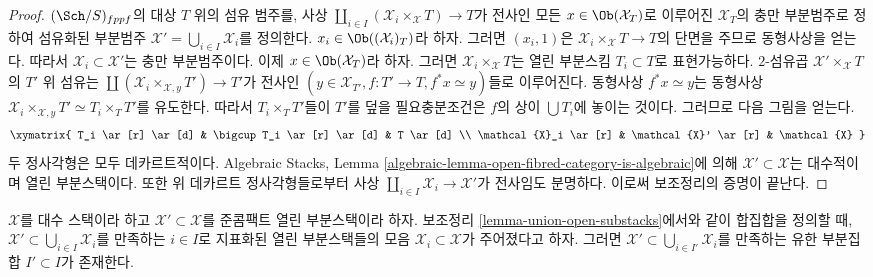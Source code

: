 \begin{proof}
$(\Sch/S)_{fppf}$의 대상 $T$ 위의 섬유 범주를, 사상
$\coprod_{i \in I} (\mathcal{X}_i \times_{\mathcal X} T) \to T$가
전사인 모든 $x \in \Ob(\mathcal{X}_T)$로 이루어진
$\mathcal{X}_T$의 충만 부분범주로 정하여 섬유화된 부분범주
$\mathcal{X}' = \bigcup_{i \in I} \mathcal{X}_i$를 정의한다.
$x_i \in \Ob((\mathcal{X}_i)_T)$라 하자. 그러면 $(x_i, 1)$은
$\mathcal{X}_i \times_{\mathcal X} T \to T$의 단면을 주므로
동형사상을 얻는다. 따라서 $\mathcal{X}_i \subset \mathcal{X}'$는 충만 부분범주이다.
이제 $x \in \Ob(\mathcal{X}_T)$라 하자. 그러면
$\mathcal{X}_i \times_{\mathcal X} T$는 열린 부분스킴 $T_i \subset T$로
표현가능하다. $2$-섬유곱 $\mathcal{X}' \times_{\mathcal X} T$의
$T'$ 위 섬유는
$\coprod (\mathcal{X}_i \times_{\mathcal X, y} T') \to T'$가 전사인
$(y \in \mathcal{X}_{T'}, f : T' \to T, f^*x \simeq y)$들로 이루어진다.
동형사상 $f^*x \simeq y$는 동형사상
$\mathcal{X}_i \times_{\mathcal X, y} T' \simeq T_i \times_T T'$를 유도한다.
따라서 $T_i \times_T T'$들이 $T'$를 덮을 필요충분조건은 $f$의 상이
$\bigcup T_i$에 놓이는 것이다. 그러므로 다음 그림을 얻는다.
$$
\xymatrix{
T_i \ar[r] \ar[d] &
\bigcup T_i \ar[r] \ar[d] &
T \ar[d] \\
\mathcal{X}_i \ar[r] &
\mathcal{X}' \ar[r] &
\mathcal{X}
}
$$
두 정사각형은 모두 데카르트적이다. Algebraic Stacks,
Lemma \ref{algebraic-lemma-open-fibred-category-is-algebraic}에 의해
$\mathcal{X'} \subset \mathcal{X}$는 대수적이며 열린 부분스택이다.
또한 위 데카르트 정사각형들로부터 사상
$\coprod_{i \in I} \mathcal{X}_i \to \mathcal{X}'$가 전사임도 분명하다.
이로써 보조정리의 증명이 끝난다.
\end{proof}

\begin{lemma}
\label{lemma-quasi-compact-finite-subcover}
$\mathcal X$를 대수 스택이라 하고 $\mathcal X' \subset \mathcal X$를
준콤팩트 열린 부분스택이라 하자. 보조정리 \ref{lemma-union-open-substacks}에서와
같이 합집합을 정의할 때,
$\mathcal{X}' \subset \bigcup_{i \in I} \mathcal{X}_i$를 만족하는
$i \in I$로 지표화된 열린 부분스택들의 모음
$\mathcal{X}_i \subset \mathcal X$가 주어졌다고 하자.
그러면 $\mathcal{X}' \subset \bigcup_{i \in I'} \mathcal{X}_i$를 만족하는
유한 부분집합 $I' \subset I$가 존재한다.
\end{lemma}

